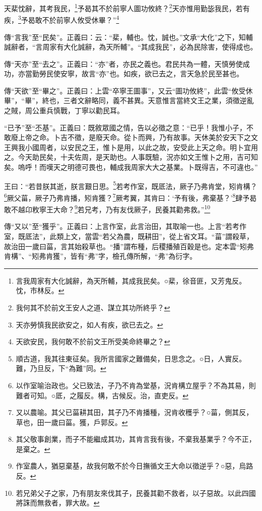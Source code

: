 天棐忱辭，其考我民，\footnote{言我周家有大化誠辭，為天所輔，其成我民矣。○棐，徐音匪，又芳鬼反。忱，市林反。}予曷其不於前寧人圖功攸終？\footnote{我何其不於前文王安人之道、謀立其功所終乎？}天亦惟用勤毖我民，若有疾，\footnote{天亦勞慎我民欲安之，如人有疾，欲已去之。}予曷敢不於前寧人攸受休畢？”\footnote{天欲安民，我何敢不於前文王所受美命終畢之？}

{\noindent\zhuan{}\fzbyks 傳“言我”至“民矣”。正義曰：云：“棐，輔也。忱，誠也。”文承“大化”之下，知輔誠辭者，“言周家有大化誠辭，為天所輔”。“其成我民”，必為民除害，使得成也。 \par}

{\noindent\zhuan{}\fzbyks 傳“天亦”至“去之”。正義曰：“亦”者，亦民之義也。君民共為一體，天慎勞使成功，亦當勤勞民使安寧，故言“亦”也。如疾，欲已去之，言天急於民至甚也。 \par}

{\noindent\zhuan{}\fzbyks 傳“天欲”至“畢之”。正義曰：上雲“卒寧王圖事”，又云“圖功攸終”，此雲“攸受休畢”，“畢”，終也，三者文辭略同，義不甚異。天意惟言當終文王之業，須徵逆亂之賊，周公重兵慎戰，丁寧以勸民耳。 \par}

{\noindent\shu{}\fzkt “已予”至“丕基”。正義曰：既敘眾國之情，告以必徵之意：“已乎！我惟小子，不敢廢上帝之命。卜吉不徵，是廢天命。從卜而興，乃有故事。天休美於安天下之文王興我小國周者，以安民之王，惟卜是用，以此之故，安受此上天之命。明卜宜用之。今天助民矣，十夫佐周，是天助也。人事既驗，況亦如文王惟卜之用，吉可知矣。嗚呼！而嘆天之明德可畏也，輔成我周家大大之基業。卜既得吉，不可違也。” \par}

王曰：“若昔朕其逝，朕言艱日思。\footnote{順古道，我其往東征矣。我所言國家之難備矣，日思念之。○日，人實反。難，乃旦反，下“為難”同。}若考作室，既厎法，厥子乃弗肯堂，矧肯構？\footnote{以作室喻治政也。父已致法，子乃不肯為堂基，況肯構立屋乎？不為其易，則難者可知。○厎，之履反。構，古候反。治，直吏反。}厥父菑，厥子乃弗肯播，矧肯獲？\footnote{又以農喻。其父已菑耕其田，其子乃不肯播種，況肯收穫乎？○菑，側其反，草也，田一歲曰菑。獲，戶郭反。}厥考翼，其肯曰：‘予有後，弗棄基？’\footnote{其父敬事創業，而子不能繼成其功，其肯言我有後，不棄我基業乎？今不正，是棄之。}肆予曷敢不越卬敉寧王大命？\footnote{作室農人，猶惡棄基，故我何敢不於今日撫循文王大命以徵逆乎？○惡，烏路反。}若兄考，乃有友伐厥子，民養其勸弗救。”\footnote{若兄弟父子之家，乃有朋友來伐其子，民養其勸不救者，以子惡故。以此四國將誅而無救者，罪大故。}


{\noindent\zhuan{}\fzbyks 傳“又以”至“獲乎”。正義曰：上言作室，此言治田，其取喻一也。上言“若考作室，既厎法”，此類上文，當雲“若父為農，既耕田”，從上省文耳。“菑”謂殺草，故治田一歲曰菑，言其始殺草也。“播”謂布種，后稷播殖百穀是也。定本雲“矧弗肯構”、“矧弗肯獲”，皆有“弗”字，檢孔傳所解，“弗”為衍字。 \par}

